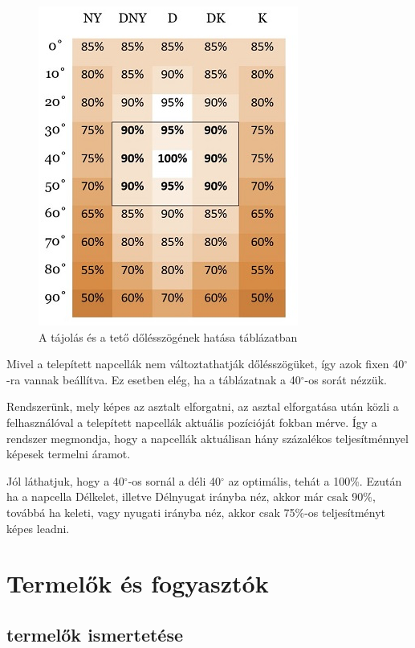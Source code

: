 \documentclass[
]{thesis-ekf}
\theoremstyle{definition}
\theoremstyle{remark}
\begin{document}
			 \begin{figure}[H]
			 	\centering
			 	\includegraphics[scale=0.60]{./images/grafikon}
			 	\caption{A tájolás és a tető dőlésszögének hatása táblázatban\cite{tajolas}}
			 \end{figure}
		 	\par Mivel a telepített napcellák nem változtathatják dőlésszögüket, így azok fixen 40$^{\circ}$-ra vannak beállítva. Ez esetben elég, ha a táblázatnak a 40$^{\circ}$-os sorát nézzük. 
		 	\par Rendszerünk, mely képes az asztalt elforgatni, az asztal elforgatása után közli a felhasználóval a telepített napcellák aktuális pozícióját fokban mérve. Így a rendszer megmondja, hogy a napcellák aktuálisan hány százalékos teljesítménnyel képesek termelni áramot.
		 	\par Jól láthatjuk, hogy a 40$^{\circ}$-os sornál a déli 40$^{\circ}$ az optimális, tehát a 100\%. Ezután ha a napcella Délkelet, illetve Délnyugat irányba néz, akkor már csak 90\%, továbbá ha keleti, vagy nyugati irányba néz, akkor csak 75\%-os teljesítményt képes leadni.
	\section{Termelők és fogyasztók}
		\subsection{termelők ismertetése}
\end{document}
